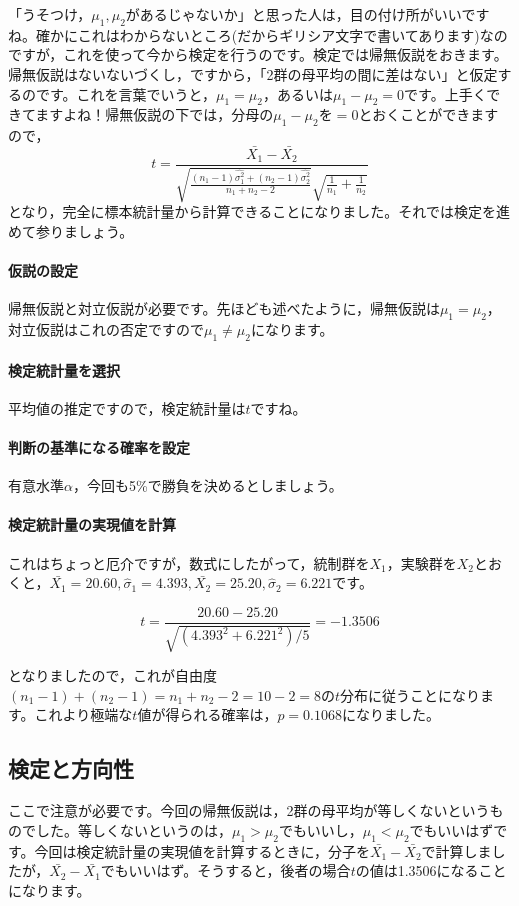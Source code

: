 \documentclass{ltjsbook}
\begin{document}
「うそつけ，$\mu_1,\mu_2$があるじゃないか」と思った人は，目の付け所がいいですね。確かにこれはわからないところ(だからギリシア文字で書いてあります)なのですが，これを使って今から検定を行うのです。検定では帰無仮説をおきます。帰無仮説はないないづくし，ですから，「2群の母平均の間に差はない」と仮定するのです。これを言葉でいうと，$\mu_1=\mu_2$，あるいは$\mu_1-\mu_2=0$です。上手くできてますよね！帰無仮説の下では，分母の$\mu_1-\mu_2$を$=0$とおくことができますので，
\[ t = \frac{\bar{X_1}-\bar{X_2}}{\sqrt{\frac{(n_1-1)\hat{\sigma_1^2}+(n_2-1)\hat{\sigma_2^2}}{n_1+n_2 - 2}}\sqrt{\frac{1}{n_1}+\frac{1}{n_2}}}\]
となり，完全に標本統計量から計算できることになりました。それでは検定を進めて参りましょう。
\paragraph{仮説の設定}帰無仮説と対立仮説が必要です。先ほども述べたように，帰無仮説は$\mu_1=\mu_2$，対立仮説はこれの否定ですので$\mu_1 \neq \mu_2$になります。
\paragraph{検定統計量を選択}平均値の推定ですので，検定統計量は$t$ですね。
\paragraph{判断の基準になる確率を設定}有意水準$\alpha$，今回も5\%で勝負を決めるとしましょう。
\paragraph{検定統計量の実現値を計算}これはちょっと厄介ですが，数式にしたがって，統制群を$X_1$，実験群を$X_2$とおくと，$\bar{X_1}=20.60,\hat{\sigma}_1=4.393,\bar{X_2}=25.20,\hat{\sigma}_2=6.221$です。

\[ t = \frac{20.60-25.20}{\sqrt{(4.393^2+6.221^2)/5}} = -1.3506\]

となりましたので，これが自由度$(n_1-1)+(n_2-1)=n_1+n_2-2=10-2=8$の$t$分布に従うことになります。これより極端な$t$値が得られる確率は，$p=0.1068$になりました。
\subsection{検定と方向性}
ここで注意が必要です。今回の帰無仮説は，2群の母平均が等しくないというものでした。等しくないというのは，$\mu_1>\mu_2$でもいいし，$\mu_1<\mu_2$でもいいはずです。今回は検定統計量の実現値を計算するときに，分子を$\bar{X_1}-\bar{X_2}$で計算しましたが，$\bar{X_2}-\bar{X_1}$でもいいはず。そうすると，後者の場合$t$の値は1.3506になることになります。
\end{document}

